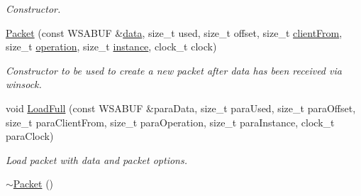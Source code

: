 \begin{DoxyCompactItemize}
\begin{DoxyCompactList}\small\item\em Constructor. \item\end{DoxyCompactList}\item 
\hyperlink{class_packet_a547b260e15dc790f8f275b532ce23771}{Packet} (const WSABUF \&\hyperlink{class_packet_a6ce50b69127890b9012cb91f287f137f}{data}, size\_\-t used, size\_\-t offset, size\_\-t \hyperlink{class_packet_ae3b05f3a3a910c466caa042f5b6961dd}{clientFrom}, size\_\-t \hyperlink{class_packet_a03920d292b5acc0f9223f6364d663001}{operation}, size\_\-t \hyperlink{class_packet_afce0ae0cb900f81df3cb1aaa2d197495}{instance}, clock\_\-t clock)
\begin{DoxyCompactList}\small\item\em Constructor to be used to create a new packet after data has been received via winsock. \item\end{DoxyCompactList}\item 
void \hyperlink{class_packet_ae9ea5d512acd9f1301da990dc58212e2}{LoadFull} (const WSABUF \&paraData, size\_\-t paraUsed, size\_\-t paraOffset, size\_\-t paraClientFrom, size\_\-t paraOperation, size\_\-t paraInstance, clock\_\-t paraClock)
\begin{DoxyCompactList}\small\item\em Load packet with data and packet options. \item\end{DoxyCompactList}\item 
\hypertarget{class_packet_a48938391fb7e07460bb0e01198ae5ede}{
\hyperlink{class_packet_a48938391fb7e07460bb0e01198ae5ede}{$\sim$Packet} ()}
\label{class_packet_a48938391fb7e07460bb0e01198ae5ede}


\end{DoxyCompactItemize}
